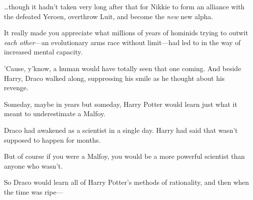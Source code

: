 {\ldots}though it hadn't taken very long after that for Nikkie to form an
alliance with the defeated Yeroen, overthrow Luit, and become the \emph{new}
new alpha.

It really made you appreciate what millions of years of hominids trying to
outwit \emph{each other}---an evolutionary arms race without limit---had led to
in the way of increased mental capacity.

'Cause, y'know, a human would have totally seen that one coming.
\sbreak
And beside Harry, Draco walked along, suppressing his smile as he thought about
his revenge.

Someday, maybe in years but someday, Harry Potter would learn just what it
meant to underestimate a Malfoy.

Draco had awakened as a scientist in a single day. Harry had said that wasn't
supposed to happen for months.

But of course if you were a Malfoy, you would be a more powerful scientist than
anyone who wasn't.

So Draco would learn all of Harry Potter's methods of rationality, and then
when the time was ripe---
